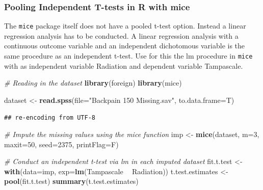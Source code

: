 \documentclass[]{book}
\newenvironment{Shaded}{\begin{snugshade}}{\end{snugshade}}
\newcommand{\KeywordTok}[1]{\textcolor[rgb]{0.13,0.29,0.53}{\textbf{#1}}}
\newcommand{\DataTypeTok}[1]{\textcolor[rgb]{0.13,0.29,0.53}{#1}}
\newcommand{\DecValTok}[1]{\textcolor[rgb]{0.00,0.00,0.81}{#1}}
\newcommand{\StringTok}[1]{\textcolor[rgb]{0.31,0.60,0.02}{#1}}
\newcommand{\CommentTok}[1]{\textcolor[rgb]{0.56,0.35,0.01}{\textit{#1}}}
\newcommand{\OperatorTok}[1]{\textcolor[rgb]{0.81,0.36,0.00}{\textbf{#1}}}
\newcommand{\NormalTok}[1]{#1}
\begin{document}
\subsubsection{Pooling Independent T-tests in R with
mice}\label{pooling-independent-t-tests-in-r-with-mice}

The \texttt{mice} package itself does not have a pooled t-test option.
Instead a linear regression analysis has to be conducted. A linear
regression analysis with a continuous outcome variable and an
independent dichotomous variable is the same procedure as an independent
t-test. Use for this the lm procedure in \texttt{mice} with as
independent variable Radiation and dependent variable Tampascale.

\begin{Shaded}
\begin{Highlighting}[]
\CommentTok{# Reading in the dataset}
\KeywordTok{library}\NormalTok{(foreign)}
\KeywordTok{library}\NormalTok{(mice)}

\NormalTok{dataset <-}\StringTok{ }\KeywordTok{read.spss}\NormalTok{(}\DataTypeTok{file=}\StringTok{"Backpain 150 Missing.sav"}\NormalTok{, }\DataTypeTok{to.data.frame=}\NormalTok{T)}
\end{Highlighting}
\end{Shaded}

\begin{verbatim}
## re-encoding from UTF-8
\end{verbatim}

\begin{Shaded}
\begin{Highlighting}[]
\CommentTok{# Impute the missing values using the mice function }
\NormalTok{imp <-}\StringTok{ }\KeywordTok{mice}\NormalTok{(dataset, }\DataTypeTok{m=}\DecValTok{3}\NormalTok{, }\DataTypeTok{maxit=}\DecValTok{50}\NormalTok{, }\DataTypeTok{seed=}\DecValTok{2375}\NormalTok{, }\DataTypeTok{printFlag=}\NormalTok{F)}
 
\CommentTok{# Conduct an independent t-test via lm in each imputed dataset}
\NormalTok{fit.t.test <-}\StringTok{ }\KeywordTok{with}\NormalTok{(}\DataTypeTok{data=}\NormalTok{imp, }\DataTypeTok{exp=}\KeywordTok{lm}\NormalTok{(Tampascale }\OperatorTok{~}\StringTok{ }\NormalTok{Radiation))}
\NormalTok{t.test.estimates <-}\StringTok{ }\KeywordTok{pool}\NormalTok{(fit.t.test)}
\KeywordTok{summary}\NormalTok{(t.test.estimates)}
\end{Highlighting}
\end{Shaded}
\end{document}
